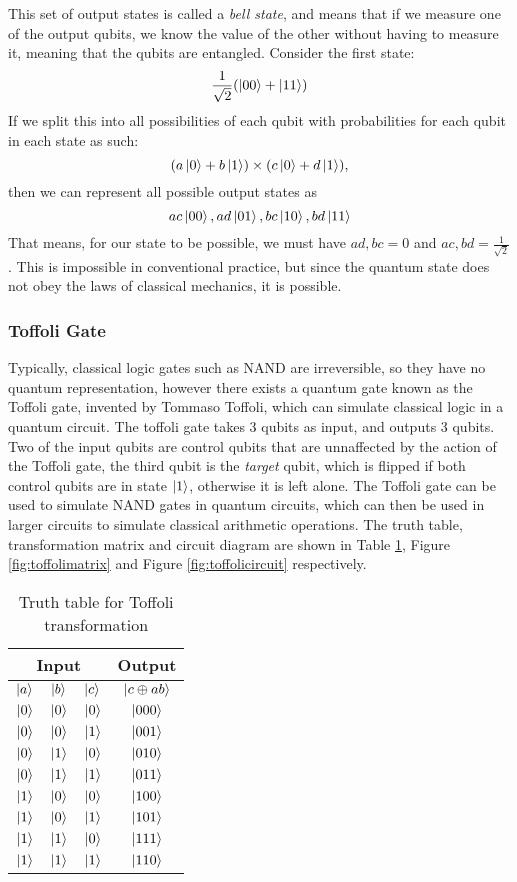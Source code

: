 This set of output states is called a \emph{bell state}, and means that if we measure one of the output qubits, we know the value of the other without having to measure it, meaning that the qubits are entangled. Consider the first state: $$\frac{1}{\sqrt{2}}(\ket{00} + \ket{11})$$
If we split this into all possibilities of each qubit with probabilities for each qubit in each state as such:
$$(a\ket{0} + b\ket{1}) \times (c\ket{0} + d\ket{1}),$$
then we can represent all possible output states as
$$ac\ket{00}, ad\ket{01}, bc\ket{10}, bd\ket{11}$$
That means, for our state to be possible, we must have $ad,bc=0$ and $ac,bd=\frac{1}{\sqrt{2}}$. This is impossible in conventional practice, but since the quantum state does not obey the laws of classical mechanics, it is possible.
\subsubsection{Toffoli Gate}
Typically, classical logic gates such as NAND are irreversible, so they have no quantum representation, however there exists a quantum gate known as the Toffoli gate, invented by Tommaso Toffoli, which can simulate classical logic in a quantum circuit. The toffoli gate takes 3 qubits as input, and outputs 3 qubits. Two of the input qubits are control qubits that are unnaffected by the action of the Toffoli gate, the third qubit is the \emph{target} qubit, which is flipped if both control qubits are in state $\ket{1}$, otherwise it is left alone. The Toffoli gate can be used to simulate NAND gates in quantum circuits, which can then be used in larger circuits to simulate classical arithmetic operations. The truth table, transformation matrix and circuit diagram are shown in Table \ref{table:toffolitruth}, Figure \ref{fig:toffolimatrix} and Figure \ref{fig:toffolicircuit} respectively.
\begin{table}[!htb]
\centering
\begin{tabular}{|c|c|c||c|}
\hline 
\multicolumn{3}{|c||}{Input} & Output \\ 
\hline 
$\ket{a}$ & $\ket{b}$ & $\ket{c}$ & $\ket{c\oplus ab}$ \\ 
\hline 
$\ket{0}$ & $\ket{0}$ & $\ket{0}$ & $\ket{000}$ \\ 
\hline 
$\ket{0}$ & $\ket{0}$ & $\ket{1}$ & $\ket{001}$ \\ 
\hline 
$\ket{0}$ & $\ket{1}$ & $\ket{0}$ & $\ket{010}$ \\ 
\hline 
$\ket{0}$ & $\ket{1}$ & $\ket{1}$ & $\ket{011}$ \\ 
\hline 
$\ket{1}$ & $\ket{0}$ & $\ket{0}$ & $\ket{100}$ \\ 
\hline 
$\ket{1}$ & $\ket{0}$ & $\ket{1}$ & $\ket{101}$ \\ 
\hline 
$\ket{1}$ & $\ket{1}$ & $\ket{0}$ & $\ket{111}$ \\ 
\hline 
$\ket{1}$ & $\ket{1}$ & $\ket{1}$ & $\ket{110}$ \\ 
\hline 
\end{tabular} 
\caption{Truth table for Toffoli transformation}
\label{table:toffolitruth}
\end{table}
